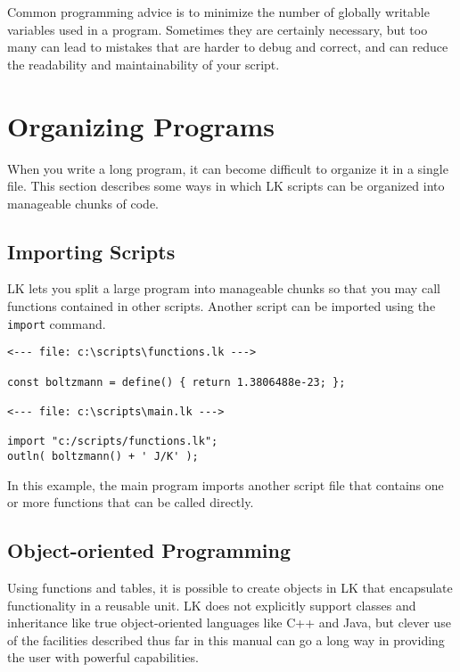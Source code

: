 \documentclass{article}
\begin{document}
Common programming advice is to minimize the number of globally writable variables used in a program.  Sometimes they are certainly necessary, but too many can lead to mistakes that are harder to debug and correct, and can reduce the readability and maintainability of your script.




\section{Organizing Programs}

When you write a long program, it can become difficult to organize it in a single file.  This section describes some ways in which LK scripts can be organized into manageable chunks of code.

\subsection{Importing Scripts}

LK lets you split a large program into manageable chunks so that you may call functions contained in other scripts.  Another script can be imported using the \texttt{import} command.

\begin{verbatim}
<--- file: c:\scripts\functions.lk --->

const boltzmann = define() { return 1.3806488e-23; };

<--- file: c:\scripts\main.lk --->

import "c:/scripts/functions.lk";
outln( boltzmann() + ' J/K' );

\end{verbatim}

In this example, the main program imports another script file that contains one or more functions that can be called directly.

\subsection{Object-oriented Programming}

Using functions and tables, it is possible to create objects in LK that encapsulate functionality in a reusable unit.  LK does not explicitly support classes and inheritance like true object-oriented languages like C++ and Java, but clever use of the facilities described thus far in this manual can go a long way in providing the user with powerful capabilities.
\end{document}
